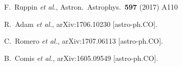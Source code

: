 \begin{thebibliography}{99}
  F.~Ruppin {\it et al.},
  Astron.\ Astrophys.\  {\bf 597} (2017) A110
  
  R.~Adam {\it et al.},
  arXiv:1706.10230 [astro-ph.CO].



  

  C.~Romero {\it et al.},
  arXiv:1707.06113 [astro-ph.CO].
  
  
  B.~Comis {\it et al.},
  arXiv:1605.09549 [astro-ph.CO].
  
  
 








\end{thebibliography}
